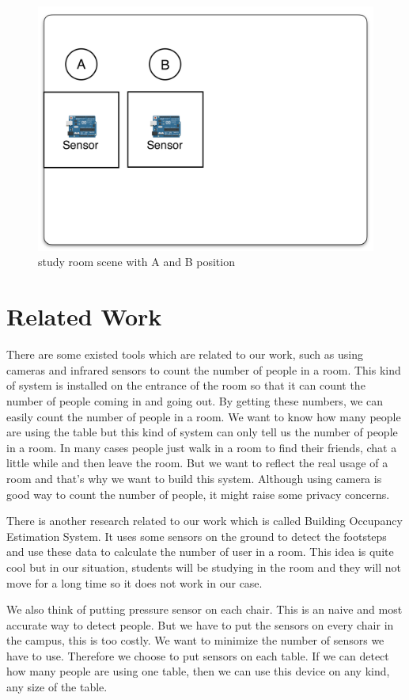 \documentclass{sig-alternate-ipsn13}
\begin{document}
\begin{figure}
  \centering
  \includegraphics[width=0.8\linewidth]{figure/scene1.png}
  \caption{study room scene with A and B position}
  \label{fig:Scene}
\end{figure}
 
\section{Related Work}
There are some existed tools which are related to our work, such as using cameras and infrared sensors to count the number of people in a room. This kind of system is installed on the entrance of the room so that it can count the number of people coming in and going out. By getting these numbers, we can easily count the number of people in a room. We want to know how many people are using the table but this kind of system can only tell us the number of people in a room. In many cases people just walk in a room to find their friends, chat a little while and then leave the room. But we want to reflect the real usage of a room and that’s why we want to build this system. Although using camera is good way to count the number of people, it might raise some privacy concerns.

There is another research related to our work which is called Building Occupancy Estimation System\cite{cite1}. It uses some sensors on the ground to detect the footsteps and use these data to calculate the number of user in a room. This idea is quite cool but in our situation, students will be studying in the room and they will not move for a long time so it does not work in our case.

We also think of putting pressure sensor on each chair. This is an naive and most accurate way to detect people. But we have to put the sensors on every chair in the campus, this is too costly. We want to minimize the number of sensors we have to use. Therefore we choose to put sensors on each table. If we can detect how many people are using one table, then we can use this device on any kind, any size of the table.
\end{document}
